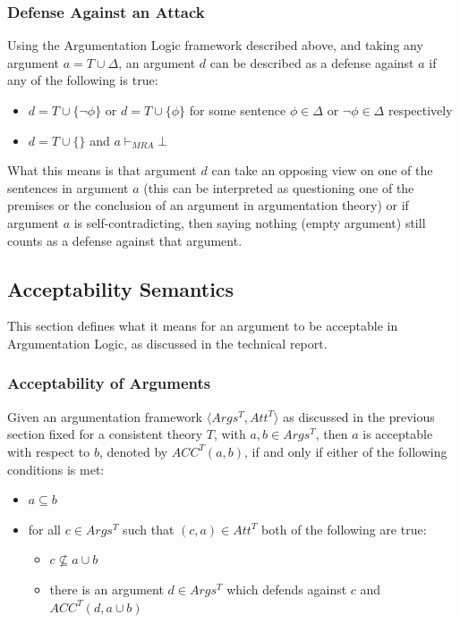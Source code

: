 \documentclass[11pt,twoside,a4paper]{report}
\begin{document}
\subsubsection{Defense Against an Attack}
\label{subsec:alfdef2}
Using the Argumentation Logic framework described above, and taking any argument $a = T\cup\Delta$, an argument $d$ can be described as a defense against $a$ if any of the following is true:
\begin{itemize}
\item
$d = T\cup\{\neg\phi\}$ or $d = T\cup\{\phi\}$ for some sentence $\phi\in\Delta$ or $\neg\phi\in\Delta$ respectively
\item
$d = T\cup\{\}$ and $a\vdash_{MRA}\bot$
\end{itemize}

What this means is that argument $d$ can take an opposing view on one of the sentences in argument $a$ (this can be interpreted as questioning one of the premises or the conclusion of an argument in argumentation theory) or if argument $a$ is self-contradicting, then saying nothing (empty argument) still counts as a defense against that argument.

\subsection{Acceptability Semantics}
This section defines what it means for an argument to be acceptable in Argumentation Logic, as discussed in the technical report.

\subsubsection{Acceptability of Arguments}
Given an argumentation framework $\langle Args^T, Att^T\rangle$ as discussed in the previous section fixed for a consistent theory $T$, with $a,b\in Args^T$, then $a$ is acceptable with respect to $b$, denoted by $ACC^T(a,b)$, if and only if either of the following conditions is met:
\begin{itemize}
\item
$a\subseteq b$
\item
for all $c\in Args^T$ such that $(c,a)\in Att^T$ both of the following are true:
\begin{itemize}
\item
$c\nsubseteq a\cup b$
\item
there is an argument $d\in Args^T$ which defends against $c$ and $ACC^T(d,a\cup b)$
\end{itemize}
\end{itemize}
\end{document}
